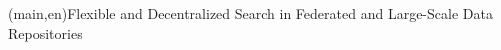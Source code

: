 
%




%
%
%
%
\nttitle(main,en){Flexible and Decentralized Search in Federated and Large-Scale Data Repositories}%




%
%
%
%



